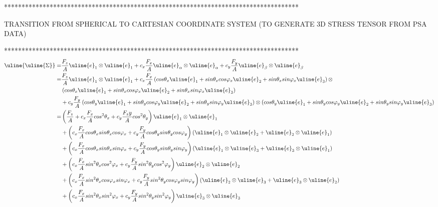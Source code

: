 \clearpage
************************************************************************************
 
TRANSITION FROM SPHERICAL TO CARTESIAN COORDINATE SYSTEM (TO GENERATE 3D STRESS TENSOR FROM PSA DATA)
  
************************************************************************************
  \begin{equation}
 \begin{split}
 \uline{\uline{\Sigma}}=&\dfrac{F_z}{A}\uline{e}_1\otimes \uline{e}_1+c_x\dfrac{F_x}{A}\uline{e}_{\alpha}\otimes \uline{e}_{\alpha}+c_y\dfrac{F_y}{A}\uline{e}_{\beta}\otimes \uline{e}_{\beta}
 \\=&\dfrac{F_z}{A}\uline{e}_1\otimes \uline{e}_1+c_x\dfrac{F_x}{A}\left(cos\theta_x\uline{e}_1+sin\theta_xcos\varphi_x\uline{e}_2+sin\theta_xsin\varphi_x\uline{e}_3 \right) \otimes \\&\left(cos\theta_x\uline{e}_1+sin\theta_xcos\varphi_x\uline{e}_2+sin\theta_xsin\varphi_x\uline{e}_3 \right)
 \\&+c_y\dfrac{F_y}{A}\left( cos\theta_y\uline{e}_1+sin\theta_ycos\varphi_y\uline{e}_2+sin\theta_ysin\varphi_y\uline{e}_3\right) \otimes\left( cos\theta_y\uline{e}_1+sin\theta_ycos\varphi_y\uline{e}_2+sin\theta_ysin\varphi_y\uline{e}_3\right)
\\=&\left(\dfrac{F_z}{A} +c_x\dfrac{F_x}{A}cos^2\theta_x+c_y\dfrac{F_zy}{A}cos^2\theta_y\right) \uline{e}_1\otimes \uline{e}_1
\\&+\left(c_x\dfrac{F_x}{A}cos\theta_xsin\theta_x cos\varphi_x+c_y\dfrac{F_y}{A}cos\theta_ysin\theta_y cos\varphi_y\right) \left( \uline{e}_1\otimes \uline{e}_2+\uline{e}_2\otimes \uline{e}_1\right) 
\\&+\left(c_x\dfrac{F_x}{A}cos\theta_xsin\theta_x sin\varphi_x+c_y\dfrac{F_y}{A}cos\theta_ysin\theta_y sin\varphi_y\right) \left( \uline{e}_1\otimes \uline{e}_3+\uline{e}_3\otimes \uline{e}_1\right) 
\\&+\left(c_x\dfrac{F_x}{A}sin^2\theta_xcos^2\varphi_x+c_y\dfrac{F_y}{A}sin^2\theta_y cos^2\varphi_y\right) \uline{e}_2\otimes \uline{e}_2
\\&+\left(c_x\dfrac{F_x}{A}sin^2\theta_x cos\varphi_xsin\varphi_x+c_y\dfrac{F_y}{A}sin^2\theta_y cos\varphi_ysin\varphi_y\right) \left( \uline{e}_2\otimes \uline{e}_3+\uline{e}_3\otimes \uline{e}_2\right) 
\\&+\left(c_x\dfrac{F_x}{A}sin^2\theta_xsin^2\varphi_x+c_y\dfrac{F_y}{A}sin^2\theta_y sin^2\varphi_y\right) \uline{e}_3\otimes \uline{e}_3
 \end{split}
 \label{tensor2}
 \end{equation}


